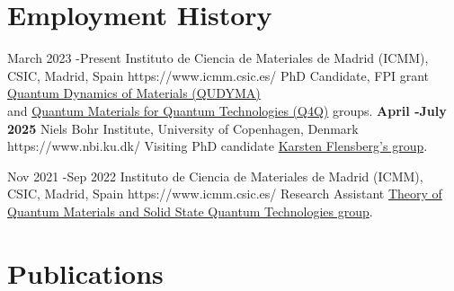 \documentclass[10pt]{article} %
\begin{document}



\section{Employment History}

\job
{March 2023 -}{Present}
{Instituto de Ciencia de Materiales de Madrid (ICMM), CSIC, Madrid, Spain}
{https://www.icmm.csic.es/}
{PhD Candidate, FPI grant}
{\href{https://sites.google.com/view/qudyma-icmm}{Quantum Dynamics of Materials (QUDYMA)} \\
and \href{https://wp.icmm.csic.es/tqe/}{Quantum Materials for Quantum Technologies (Q4Q)} groups.}
\vspace{-0.5cm}
\stay
{\textbf{April -}}{\textbf{July 2025}}
{Niels Bohr Institute, University of Copenhagen, Denmark}
{https://www.nbi.ku.dk/}
{Visiting PhD candidate}
{\href{https://nbi.ku.dk/english/research/condensed-matter-physics/condensed-matter-theory/}{Karsten Flensberg's group}.}



\job
{Nov 2021 -}{Sep 2022}
{Instituto de Ciencia de Materiales de Madrid (ICMM), CSIC, Madrid, Spain}
{https://www.icmm.csic.es/}
{Research Assistant}
{\href{https://wp.icmm.csic.es/tqe/}{Theory of Quantum Materials and Solid State Quantum Technologies group}.}



\section{Publications}
\end{document}
